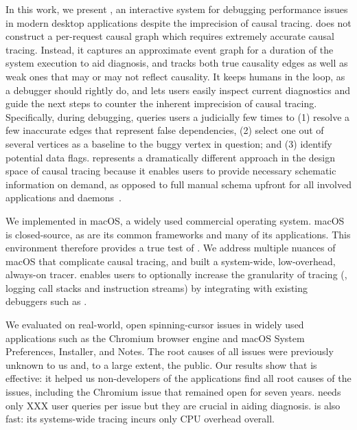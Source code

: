 In this work, we present \xxx, an interactive system for debugging
performance issues in modern desktop applications despite the imprecision
of causal tracing. \xxx does not construct a per-request causal graph
which requires extremely accurate causal tracing.  Instead, it captures an
approximate event graph for a duration of the system execution to aid
diagnosis, and tracks both true causality edges as well as weak ones that
may or may not reflect causality.  It keeps humans in the loop, as a
debugger should rightly do,
and lets users easily inspect current diagnostics and guide the next steps
to counter the inherent imprecision of causal tracing.  Specifically,
during debugging, \xxx queries users a judicially few times to (1) resolve
a few inaccurate edges that represent false dependencies, (2) select one
out of several vertices as a baseline to the buggy vertex in question; and
(3) identify potential data flags.  \xxx represents a dramatically
different approach in the design space of causal tracing because it
enables users to provide necessary schematic information on demand, as
opposed to full manual schema upfront for all involved applications and
daemons~\cite{barham2004using}.

We implemented \xxx in macOS, a widely used commercial operating
system. macOS is closed-source, as are its common frameworks and many of
its applications.  This environment therefore provides a true test of
\xxx.  We address multiple nuances of macOS that complicate causal
tracing, and built a system-wide, low-overhead, always-on tracer.  \xxx
enables users to optionally increase the granularity of tracing (\eg,
logging call stacks and instruction streams) by integrating with existing
debuggers such as .

We evaluated \xxx on \nbug real-world, open spinning-cursor issues in
widely used applications such as the Chromium browser engine and macOS
System Preferences, Installer, and Notes.  The root causes of all \nbug
issues were previously unknown to us and, to a large extent, the
public. Our results show that \xxx is effective: it helped us
non-developers of the applications find all root causes of the issues,
including the Chromium issue that remained open for seven years.  \xxx
needs only XXX user queries per issue but they are crucial in aiding
diagnosis. \xxx is also fast: its systems-wide tracing incurs only \cpuoverhead CPU
overhead overall.


